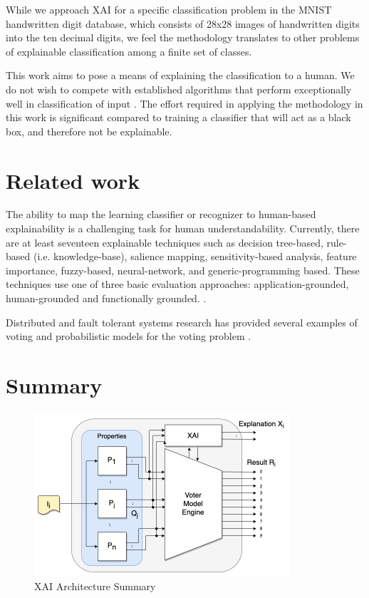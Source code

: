 \documentclass[conference]{IEEEtran}
\begin{document}
While we approach XAI for a specific classification problem in the MNIST handwritten digit database, which consists of 28x28 images of handwritten digits into the ten decimal digits, we feel the methodology translates to other problems of explainable classification among a finite set of classes.

This work aims to pose a means of explaining the classification to a human.  We do not wish to compete with established algorithms that perform exceptionally well in classification of input \cite{keysers07} \cite{lecun98} \cite{schm2012}.  The effort required in applying the methodology in this work is significant compared to training a classifier that will act as a black box, and therefore not be explainable.

\section{Related work}

The ability to map the learning classifier or recognizer to human-based explainability is a challenging task for human understandability.  Currently, there are at least seventeen explainable techniques such as
decision tree-based, rule-based (i.e. knowledge-base), salience mapping,
sensitivity-based analysis, feature importance, fuzzy-based, neural-network, and generic-programming based.  These techniques use one of three basic evaluation approaches: application-grounded, human-grounded and functionally grounded. \cite{BlackBox18} \cite{Survey18} \cite{Fuzzy19} \cite{Hagras18}  \cite{GP18}.

Distributed and fault tolerant systems research has provided several examples of voting \cite{avizienis} and probabilistic models for the voting problem \cite{blough}.

\section{Summary}

 \begin{figure}[htbp]
\centerline{\includegraphics[width=95mm]{./images/voting_prop_nn_2.png}}
\caption{XAI Architecture Summary}
\label{voting}
\end{figure}
\end{document}
